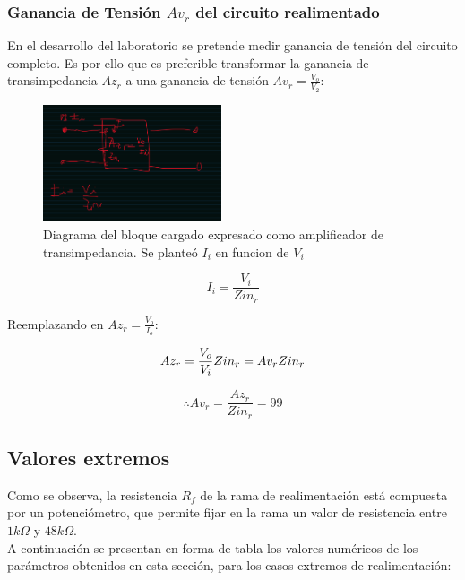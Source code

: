 \documentclass[letterpaper, 10 pt, conference]{ieeeconf}  %
\begin{document}
\subsubsection{Ganancia de Tensión $Av_r$ del circuito realimentado}

En el desarrollo del laboratorio se pretende medir ganancia de tensión del circuito completo. Es por ello que es preferible transformar la ganancia de transimpedancia $Az_r$ a una ganancia de tensión $Av_r = \frac{V_o}{V_2}$:

\begin{figure}[H]
  \centering
  \includegraphics[width=0.47\textwidth]{imagenes/transf.png}
  \caption{Diagrama del bloque cargado expresado como amplificador de transimpedancia. Se planteó $I_i$ en funcion de $V_i$}
  \label{fig:diagrama_bloques_realimentacion}
\end{figure}

\begin{equation}
I_i = \frac{V_i}{Zin_r}
\end{equation}

Reemplazando en $Az_r = \frac{V_o}{I_o}$:

\begin{equation}
 Az_r = \frac{V_o}{V_i} Zin_r = Av_rZin_r \\
\end{equation}

\begin{equation}
\therefore Av_r = \frac{Az_r}{Zin_r} = 99
\end{equation}

\subsection{Valores extremos}
Como se observa, la resistencia $R_f$ de la rama de realimentación está compuesta por un potenciómetro, que permite fijar en la rama un valor de resistencia entre $1k\Omega$ y $48k\Omega$.\\
A continuación se presentan en forma de tabla los valores numéricos de los parámetros obtenidos en esta sección, para los casos extremos de realimentación:
\end{document}
